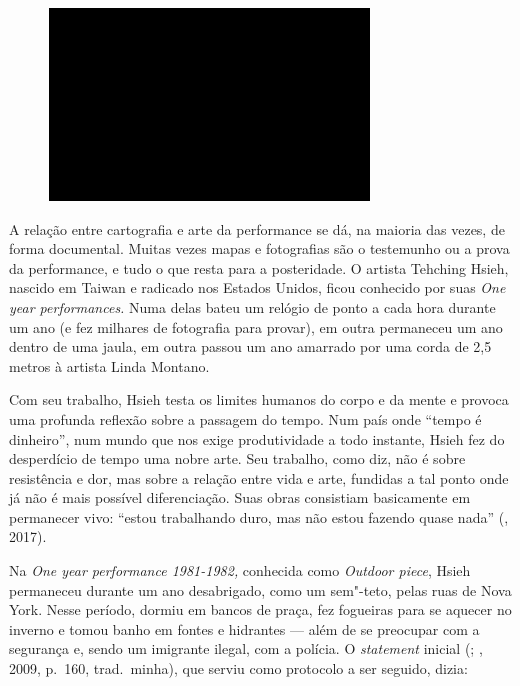 \begin{figure}[!ht]

\centering
 \includegraphics[width=85mm]{./imgs/im1.jpg}
\caption{\tiny{}}

\end{figure}

A relação entre cartografia e arte da performance se dá, na maioria
das vezes, de forma documental. Muitas vezes mapas e fotografias são o
testemunho ou a prova da performance, e tudo o que resta para a
posteridade. O artista Tehching Hsieh, nascido em Taiwan e radicado nos
Estados Unidos, ficou conhecido por suas \emph{One year performances.}
Numa delas bateu um relógio de ponto a cada hora durante um ano (e fez
milhares de fotografia para provar), em outra permaneceu um ano dentro
de uma jaula, em outra passou um ano amarrado por uma corda de 2,5
metros à artista Linda Montano.

Com seu trabalho, Hsieh testa os limites humanos do corpo e da mente e
provoca uma profunda reflexão sobre a passagem do tempo. Num país onde
``tempo é dinheiro'', num mundo que nos exige produtividade a todo
instante, Hsieh fez do desperdício de tempo uma nobre arte. Seu
trabalho, como diz, não é sobre resistência e dor, mas sobre a relação
entre vida e arte, fundidas a tal ponto onde já não é mais possível
diferenciação. Suas obras consistiam basicamente em permanecer vivo:
``estou trabalhando duro, mas não estou fazendo quase nada'' (,
2017).

Na \emph{One year performance 1981-1982,} conhecida como \emph{Outdoor
piece}, Hsieh permaneceu durante um ano desabrigado, como um sem"-teto,
pelas ruas de Nova York. Nesse período, dormiu em bancos de praça, fez
fogueiras para se aquecer no inverno e tomou banho em fontes e hidrantes
--- além de se preocupar com a segurança e, sendo um imigrante ilegal,
com a polícia. O \emph{statement} inicial (; , 2009, p.~160, trad.~minha), que serviu como protocolo a ser seguido, dizia:

